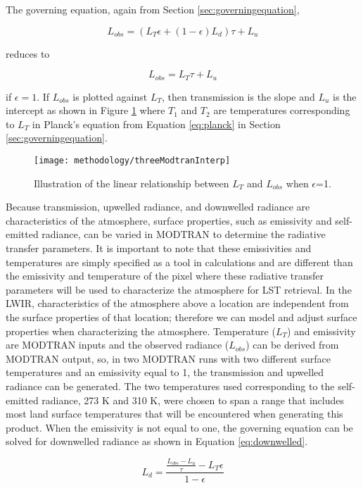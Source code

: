 \documentclass{book}
\begin{document}
The governing equation, again from Section \ref{sec:governingequation},

\[
L_{obs} = (L_T\epsilon+(1-\epsilon)L_d)\tau + L_u
\]

reduces to 

\[
L_{obs} = L_T{\tau} + L_u
\]

if $\epsilon=1$.  If $L_{obs}$ is plotted against $L_T$, then transmission is the slope and $L_u$ is the intercept as shown in Figure \ref{fig:threeModtranInterp} where $T_1$ and $T_2$ are temperatures corresponding to $L_T$ in Planck's equation from Equation \ref{eq:planck} in Section \ref{sec:governingequation}.

\begin{figure}[H]
\centering
\texttt{[image: methodology/threeModtranInterp]}
\caption{Illustration of the linear relationship between $L_T$ and $L_{obs}$ when $\epsilon$=1.}
\label{fig:threeModtranInterp}
\end{figure}

Because transmission, upwelled radiance, and downwelled radiance are characteristics of the atmosphere, surface properties, such as emissivity and self-emitted radiance, can be varied in MODTRAN to determine the radiative transfer parameters.  It is important to note that these emissivities and temperatures are simply specified as a tool in calculations and are different than the emissivity and temperature of the pixel where these radiative transfer parameters will be used to characterize the atmosphere for LST retrieval.  In the LWIR, characteristics of the atmosphere above a location are independent from the surface properties of that location; therefore we can model and adjust surface properties when characterizing the atmosphere.  Temperature ($L_T$) and emissivity are MODTRAN inputs and the observed radiance ($L_{obs}$) can be derived from MODTRAN output, so, in two MODTRAN runs with two different surface temperatures and an emissivity equal to 1, the transmission and upwelled radiance can be generated.  The two temperatures used corresponding to the self-emitted radiance, 273 K and 310 K, were chosen to span a range that includes most land surface temperatures that will be encountered when generating this product.  When the emissivity is not equal to one, the governing equation can be solved for downwelled radiance as shown in Equation \ref{eq:downwelled}.

\begin{equation}
L_d = \frac{\frac{L_{obs}-L_u}{\tau}-L_T\epsilon}{1-\epsilon}
\label{eq:downwelled}
\end{equation}
\end{document}
